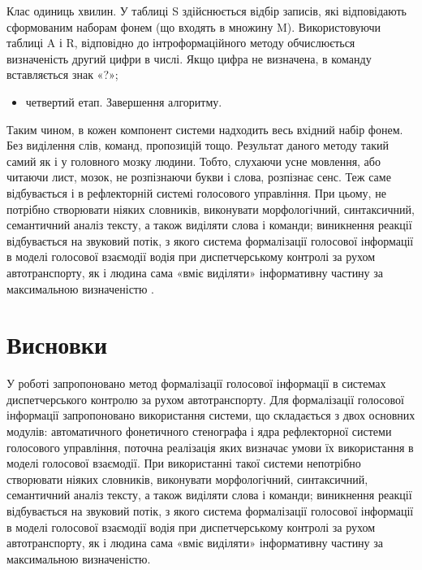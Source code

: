 Клас одиниць хвилин. У таблиці S здійснюється відбір записів, які відповідають сформованим наборам фонем (що входять в множину M). Використовуючи таблиці A і R, відповідно до інтроформаційного методу обчислюється визначеність другий цифри в числі. Якщо цифра не визначена, в команду вставляється знак «?»;

\begin{itemize}
	\item четвертий етап. Завершення алгоритму.
\end{itemize}

Таким чином, в кожен компонент системи надходить весь вхідний набір фонем. Без виділення слів, команд, пропозицій тощо. Результат даного методу такий самий як і у головного мозку людини. Тобто, слухаючи усне мовлення, або читаючи лист, мозок, не розпізнаючи букви і слова, розпізнає сенс. Теж саме відбувається і в рефлекторній системі голосового управління. При цьому, не потрібно створювати ніяких словників, виконувати морфологічний, синтаксичний, семантичний аналіз тексту, а також виділяти слова і команди; виникнення реакції відбувається на звуковий потік, з якого система формалізації голосової інформації в моделі голосової взаємодії водія при диспетчерському контролі за рухом автотранспорту, як і людина сама «вміє виділяти» інформативну частину за максимальною визначеністю \cite{Teslia_2013}.

\section{Висновки}

У роботі запропоновано метод формалізації голосової інформації в системах диспетчерського контролю за рухом автотранспорту. Для формалізації голосової інформації запропоновано використання системи, що складається з двох основних модулів: автоматичного фонетичного стенографа і ядра рефлекторної системи голосового управління, поточна реалізація яких визначає умови їх використання в моделі голосової взаємодії. При використанні такої системи непотрібно створювати ніяких словників, виконувати морфологічний, синтаксичний, семантичний аналіз тексту, а також виділяти слова і команди; виникнення реакції відбувається на звуковий потік, з якого система формалізації голосової інформації в моделі голосової взаємодії водія при диспетчерському контролі за рухом автотранспорту, як і людина сама «вміє виділяти» інформативну частину за максимальною визначеністю.
